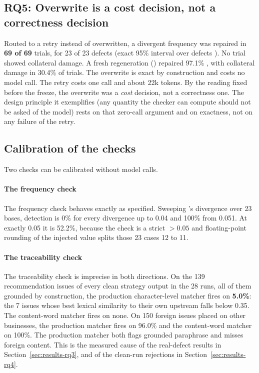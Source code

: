 \subsection{RQ5: Overwrite is a cost decision, not a correctness decision}
\label{sec:results-rq5}

Routed to a retry instead of overwritten, a divergent frequency was repaired in
\textbf{69 of 69}  trials, for 23 of 23 defects (exact 95\% interval
over defects ). No trial showed collateral damage. A fresh
regeneration () repaired 97.1\% , with collateral damage
in 30.4\% of trials. The overwrite is exact by construction and costs no model
call. The retry costs one call and about 22k tokens. By the reading fixed before
the freeze, the overwrite was a \emph{cost} decision, not a correctness one. The
design principle it exemplifies (any quantity the checker can compute should
not be asked of the model) rests on that zero-call argument and on exactness,
not on any failure of the retry.

\subsection{Calibration of the checks}
\label{sec:results-calibration}

Two checks can be calibrated without model calls.

\paragraph{The frequency check}
The frequency check behaves exactly as specified. Sweeping 's divergence
over 23 bases, detection is 0\% for every divergence up to 0.04 and 100\% from
0.051. At exactly 0.05 it is 52.2\%, because the check is a strict $>0.05$ and
floating-point rounding of the injected value splits those 23 cases 12 to 11.

\paragraph{The traceability check}
The traceability check is imprecise in both directions. On the 139
recommendation issues of every clean strategy output in the 28 runs, all of
them grounded by construction, the production character-level matcher fires on
\textbf{5.0\%}: the 7 issues whose best lexical similarity to their own
upstream falls below 0.35. The content-word matcher fires on none. On 150
foreign issues placed on other businesses, the production matcher fires on
96.0\% and the content-word matcher on 100\%. The production matcher both
flags grounded paraphrase and misses foreign content. This is the measured
cause of the real-defect results in Section~\ref{sec:results-rq3}, and of the
clean-run rejections in Section~\ref{sec:results-rq4}.

